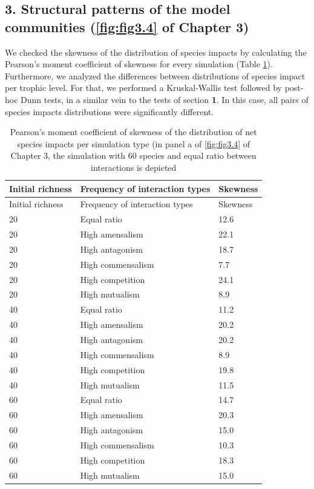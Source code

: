 \subsection*{3. Structural patterns of the model communities (\cref{fig:fig3.4} of Chapter 3)}

We checked the skewness of the distribution of species impacts by calculating the Pearson's moment coefficient of skewness for every simulation (Table \ref{tab:tableApp3.2.4}). Furthermore, we analyzed the differences between distributions of species impact per trophic level. For that, we performed a Kruskal-Wallis test followed by post-hoc Dunn tests, in a similar vein to the tests of section \textbf{1}. In this case, all pairs of species impacts distributions were significantly different.

\begin{longtable}[]{@{}lll@{}}
\caption[Skewness of species impacts]{\color{Gray} Pearson's moment coefficient of skewness of the distribution of net species impacts per simulation type (in panel a of \cref{fig:fig3.4} of Chapter 3, the simulation with 60 species and equal ratio between interactions is depicted}\label{tab:tableApp3.2.4}\\

Initial richness & Frequency of interaction types & Skewness\tabularnewline
\midrule
\endfirsthead
\toprule
Initial richness & Frequency of interaction types & Skewness\tabularnewline
\midrule
\endhead

20 & Equal ratio & 12.6\tabularnewline
20 & High amensalism & 22.1\tabularnewline
20 & High antagonism & 18.7\tabularnewline
20 & High commensalism & 7.7\tabularnewline
20 & High competition & 24.1\tabularnewline
20 & High mutualism & 8.9\tabularnewline
40 & Equal ratio & 11.2\tabularnewline
40 & High amensalism & 20.2\tabularnewline
40 & High antagonism & 20.2\tabularnewline
40 & High commensalism & 8.9\tabularnewline
40 & High competition & 19.8\tabularnewline
40 & High mutualism & 11.5\tabularnewline
60 & Equal ratio & 14.7\tabularnewline
60 & High amensalism & 20.3\tabularnewline
60 & High antagonism & 15.0\tabularnewline
60 & High commensalism & 10.3\tabularnewline
60 & High competition & 18.3\tabularnewline
60 & High mutualism & 15.0\tabularnewline
\bottomrule

\end{longtable}

